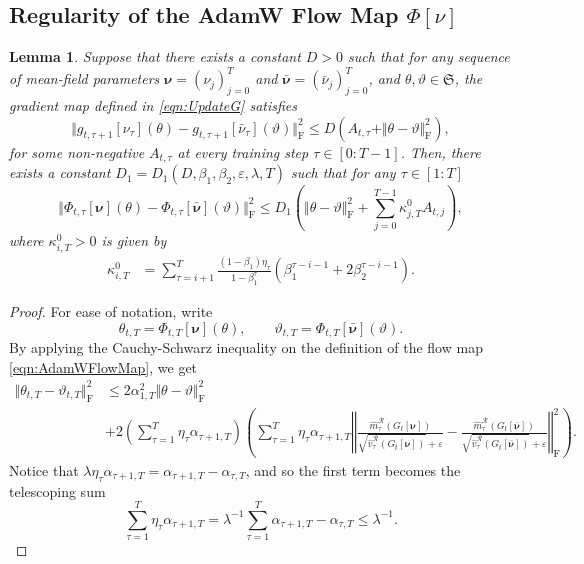 \documentclass{article}
\newtheorem{lemma}[theorem]{Lemma}
\begin{document}
\begin{appendices}
\section{Regularity of the AdamW Flow Map $\Phi[\nu]$}\label{App:F}
\begin{lemma}\label{lemma:AdamLip}
Suppose that there exists a constant $D>0$ such that for any sequence of mean-field parameters $\bm\nu=(\nu_j)_{j=0}^T$ and $\bm{\bar \nu}=(\bar\nu_j)_{j=0}^T$, and  $\theta, \vartheta\in \mathfrak{S}$, the gradient map defined in \eqref{eqn:UpdateG} satisfies 
\[
 \Vert g_{t,\tau+1}[\nu_\tau](\theta) -  g_{t,\tau+1}[\bar \nu_\tau]( \vartheta)\Vert^2_\mathrm{F}  \le D\left(A_{t,\tau}+ \Vert \theta-\vartheta \Vert^2_\mathrm{F} \right),
\]
 for some non-negative $A_{t,\tau}$ at every training step $\tau \in[0:T-1]$. Then, there exists a constant $D_1=D_1(D,\beta_1,\beta_2,\varepsilon,\lambda,T)$ such that for any $\tau\in [1: T]$
        \[
 \Vert\Phi_{t,\tau}[\bm\nu](\theta)-\Phi_{t,\tau}[\bm{\bar\nu}](\vartheta)\Vert^2_\mathrm{F} \le  D_1\left(\Vert \theta-\vartheta\Vert^2_\mathrm{F}+\sum_{j=0}^{T-1}\kappa^0_{j,T}A_{t,j}\right),
    \]
where $\kappa^0_{i,T}>0$ is given by
\begin{align}\label{eqn:kappa}
    \kappa^0_{i,T} &=\sum_{\tau=i+1}^T\frac{(1-\beta_1)\eta_\tau}{1-\beta_1^\tau}(\beta_1^{\tau-i-1}+2\beta_2^{\tau-i-1}).
\end{align}
\end{lemma}
\begin{proof}
For ease of notation, write
\[
\theta_{t,T} = \Phi_{t,T}[\bm\nu](\theta), \qquad  \vartheta_{t,T}=\Phi_{t,T}[\bm{\bar\nu}](\vartheta).
\]
By applying the Cauchy-Schwarz inequality on the definition of the flow map \eqref{eqn:AdamWFlowMap}, we get
\begin{align*}
     \Vert\theta_{t,T}-\vartheta_{t,T}\Vert^2_\mathrm{F}&\le2\alpha^2_{1,T}\Vert \theta-\vartheta\Vert^2_\mathrm{F} \\& +2\left(\sum_{\tau=1}^T \eta_\tau \alpha_{\tau+1,T} \right)\left(\sum_{\tau=1}^T \eta_\tau \alpha_{\tau+1,T} \left\Vert\frac{\hat m^\mathcal{R}_\tau(G_t[\bm\nu])}{\sqrt{\hat v^\mathcal{R}_\tau(G_t[\bm\nu])}+\varepsilon}-\frac{\hat m^\mathcal{R}_\tau(G_t[\bm{\bar\nu}])}{\sqrt{\hat v^\mathcal{R}_\tau(G_t[\bm{\bar\nu}])}+\varepsilon}\right\Vert^2_\mathrm{F}\right).
\end{align*}
Notice that $\lambda \eta_\tau \alpha_{\tau+1,T}=\alpha_{\tau+1,T}-\alpha_{\tau,T}$, and so the first term becomes the telescoping sum
\[
\sum_{\tau=1}^T \eta_\tau \alpha_{\tau+1,T} = \lambda^{-1}\sum_{\tau=1}^T\alpha_{\tau+1,T}-\alpha_{\tau,T}\le \lambda^{-1}.
\]
\end{proof}
\end{appendices}
\end{document}
